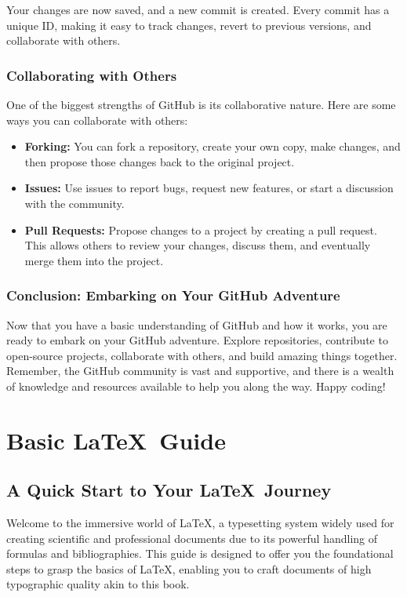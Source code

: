\documentclass[a4paper,12pt]{book}
\begin{document}
Your changes are now saved, and a new commit is created. Every commit has a unique ID, making it easy to track changes, revert to previous versions, and collaborate with others.

\subsection*{Collaborating with Others}

One of the biggest strengths of GitHub is its collaborative nature. Here are some ways you can collaborate with others:

\begin{itemize}
    \item \textbf{Forking:} You can fork a repository, create your own copy, make changes, and then propose those changes back to the original project.
    \item \textbf{Issues:} Use issues to report bugs, request new features, or start a discussion with the community.
    \item \textbf{Pull Requests:} Propose changes to a project by creating a pull request. This allows others to review your changes, discuss them, and eventually merge them into the project.
\end{itemize}

\subsection*{Conclusion: Embarking on Your GitHub Adventure}

Now that you have a basic understanding of GitHub and how it works, you are ready to embark on your GitHub adventure. Explore repositories, contribute to open-source projects, collaborate with others, and build amazing things together. Remember, the GitHub community is vast and supportive, and there is a wealth of knowledge and resources available to help you along the way. Happy coding!

\chapter{Basic \LaTeX\ Guide}
\section*{A Quick Start to Your \LaTeX\ Journey}

Welcome to the immersive world of \LaTeX, a typesetting system widely used for creating scientific and professional documents due to its powerful handling of formulas and bibliographies. This guide is designed to offer you the foundational steps to grasp the basics of \LaTeX, enabling you to craft documents of high typographic quality akin to this book.
\end{document}
